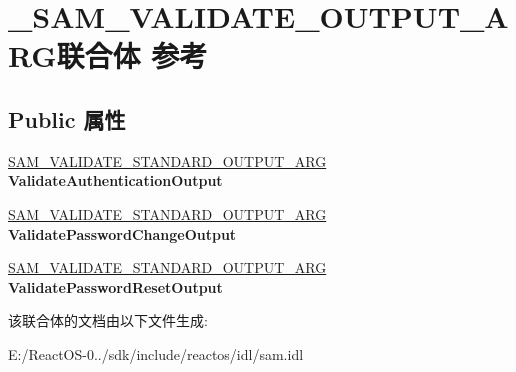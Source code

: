\hypertarget{union___s_a_m___v_a_l_i_d_a_t_e___o_u_t_p_u_t___a_r_g}{}\section{\+\_\+\+S\+A\+M\+\_\+\+V\+A\+L\+I\+D\+A\+T\+E\+\_\+\+O\+U\+T\+P\+U\+T\+\_\+\+A\+R\+G联合体 参考}
\label{union___s_a_m___v_a_l_i_d_a_t_e___o_u_t_p_u_t___a_r_g}
\subsection*{Public 属性}
\begin{DoxyCompactItemize}
\item 
\mbox{\label{union___s_a_m___v_a_l_i_d_a_t_e___o_u_t_p_u_t___a_r_g_aebe170528f0a394fa1bca8703cbbd644}} 
\hyperlink{struct___s_a_m___v_a_l_i_d_a_t_e___s_t_a_n_d_a_r_d___o_u_t_p_u_t___a_r_g}{S\+A\+M\+\_\+\+V\+A\+L\+I\+D\+A\+T\+E\+\_\+\+S\+T\+A\+N\+D\+A\+R\+D\+\_\+\+O\+U\+T\+P\+U\+T\+\_\+\+A\+RG} {\bfseries Validate\+Authentication\+Output}
\item 
\mbox{\label{union___s_a_m___v_a_l_i_d_a_t_e___o_u_t_p_u_t___a_r_g_a1c305e76e1dcef4ddd62977bf24a93a2}} 
\hyperlink{struct___s_a_m___v_a_l_i_d_a_t_e___s_t_a_n_d_a_r_d___o_u_t_p_u_t___a_r_g}{S\+A\+M\+\_\+\+V\+A\+L\+I\+D\+A\+T\+E\+\_\+\+S\+T\+A\+N\+D\+A\+R\+D\+\_\+\+O\+U\+T\+P\+U\+T\+\_\+\+A\+RG} {\bfseries Validate\+Password\+Change\+Output}
\item 
\mbox{\label{union___s_a_m___v_a_l_i_d_a_t_e___o_u_t_p_u_t___a_r_g_a7ae18e42a94131c03cbb7d93992e808d}} 
\hyperlink{struct___s_a_m___v_a_l_i_d_a_t_e___s_t_a_n_d_a_r_d___o_u_t_p_u_t___a_r_g}{S\+A\+M\+\_\+\+V\+A\+L\+I\+D\+A\+T\+E\+\_\+\+S\+T\+A\+N\+D\+A\+R\+D\+\_\+\+O\+U\+T\+P\+U\+T\+\_\+\+A\+RG} {\bfseries Validate\+Password\+Reset\+Output}
\end{DoxyCompactItemize}


该联合体的文档由以下文件生成\+:\begin{DoxyCompactItemize}
\item 
E\+:/\+React\+O\+S-\/0../sdk/include/reactos/idl/sam.\+idl\end{DoxyCompactItemize}
